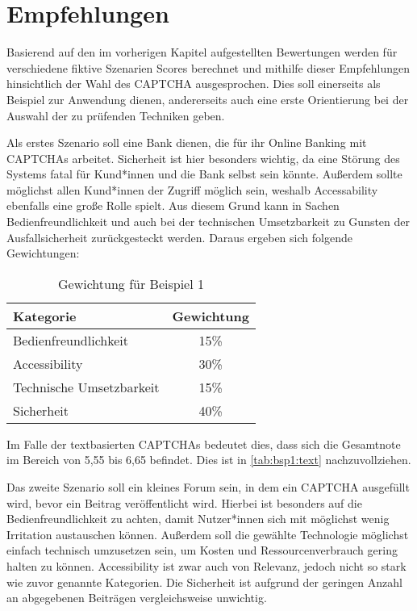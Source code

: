 \chapter{Empfehlungen}
\label{ch:empfehlung}

Basierend auf den im vorherigen Kapitel aufgestellten Bewertungen werden für verschiedene fiktive Szenarien Scores berechnet 
und mithilfe dieser Empfehlungen hinsichtlich der Wahl des CAPTCHA ausgesprochen. 
Dies soll einerseits als Beispiel zur Anwendung dienen, 
andererseits auch eine erste Orientierung bei der Auswahl der zu prüfenden Techniken geben. 

Als erstes Szenario soll eine Bank dienen, die für ihr Online Banking mit CAPTCHAs arbeitet.
Sicherheit ist hier besonders wichtig, 
da eine Störung des Systems fatal für Kund*innen und die Bank selbst sein könnte.
Außerdem sollte möglichst allen Kund*innen der Zugriff möglich sein, 
weshalb Accessability ebenfalls eine große Rolle spielt.
Aus diesem Grund kann in Sachen Bedienfreundlichkeit 
und auch bei der technischen Umsetzbarkeit zu Gunsten der Ausfallsicherheit zurückgesteckt werden.
Daraus ergeben sich folgende Gewichtungen:

\begin{table}[h!]
    \caption{Gewichtung für Beispiel 1}
    \begin{center}
        \begin{tabular}{l|c}
            Kategorie                       & Gewichtung \\\hline
            Bedienfreundlichkeit            & 15\%         \\
            Accessibility                   & 30\%        \\
            Technische Umsetzbarkeit        & 15\%         \\
            Sicherheit                      & 40\%         
        \end{tabular}
    \end{center}
\end{table}

Im Falle der textbasierten CAPTCHAs bedeutet dies, dass sich die Gesamtnote im Bereich von 5,55 bis 6,65 befindet.
Dies ist in \autoref{tab:bsp1:text} nachzuvollziehen.


Das zweite Szenario soll ein kleines Forum sein, in dem ein CAPTCHA ausgefüllt wird, bevor ein Beitrag veröffentlicht wird.
Hierbei ist besonders auf die Bedienfreundlichkeit zu achten, damit Nutzer*innen sich mit möglichst wenig Irritation austauschen können.
Außerdem soll die gewählte Technologie möglichst einfach technisch umzusetzen sein, um Kosten und Ressourcenverbrauch gering halten zu können.
Accessibility ist zwar auch von Relevanz, jedoch nicht so stark wie zuvor genannte Kategorien.
Die Sicherheit ist aufgrund der geringen Anzahl an abgegebenen Beiträgen vergleichsweise unwichtig.

